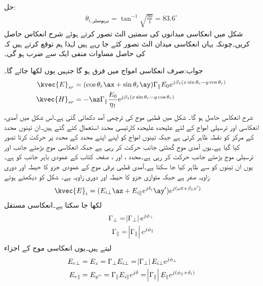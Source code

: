 حل:
\begin{align}
\theta_{i,\text{بریوسٹر}} =\tan^{-1} \sqrt{\frac{80}{1}}=83.6^{\circ}
\end{align} 
شکل  میں انعکاسی میدانوں کی سمتیں الٹ تصور کرتے ہوئے شرح انعکاس  حاصل کریں۔چونکہ یہاں انعکاسی میدان الٹ تصور کئے جا رہے ہیں لہٰذا ہم توقع کرتے ہیں کہ  کی حاصل مساوات منفی ایک سے ضرب ہو گی۔

جواب:صرف انعکاسی امواج میں فرق ہو گا جنہیں یوں لکھا جائے گا۔
\begin{align*}
\kvec{E}_{sr}&= (\cos \theta_r \ax+\sin \theta_r \ay)\Gamma_{\parallel} E_0 e^{ j \beta_1 (x \sin \theta_r-y\cos \theta_r)}\\
\kvec{H}_{sr}&=-\az\Gamma_{\parallel} \frac{ E_0}{\eta_1} e^{j \beta_1 (x \sin \theta_r-y\cos \theta_r)}
\end{align*}
شرح انعکاس  حاصل ہو گا۔
شکل  میں قطبی موج کی ترچھی آمد دکھائی گئی ہے۔اس شکل میں آمدی، انعکاسی اور ترسیلی امواج کے لئے علیحدہ علیحدہ کارتیسی محدد استعمال کئے گئے ہیں۔ان تینوں محدد کے مرکز کو نقطہ  ظاہر کرتی ہے جبکہ تینوں امواج کو اپنے اپنے محدد کے  محدد پر حرکت کرتا تصور کیا گیا ہے۔یوں آمدی موج گھٹتی  جانب حرکت کر رہی ہے جبکہ انعکاسی موج  بڑھتے  جانب اور ترسیلی موج بڑھتے  جانب حرکت کر رہی ہے۔محدد ،  اور ،  صفحہ کتاب کے عمودی باہر جانب کو ہے۔یوں ان تینوں کو  سے ظاہر کیا جا سکتا ہے۔آمدی قطبی برقی موج کے عمودی جزو کا حیطہ  اور دوری زاویہ صفر ہے جبکہ متوازی جزو کا حیطہ  اور دوری زاویہ   ہے۔ شکل کو دیکھتے ہوئے 
\begin{align}\label{مساوات_ترچھی_بیضوی__قطبی}
\kvec{E}_i&=(E_{i\perp} \az+E_{i\parallel} e^{j\delta_i}\ay')e^{j(\omega t+\beta_1 x')}
\end{align}
لکھا جا سکتا ہے۔انعکاسی مستقل
\begin{align}
\Gamma_{\perp}=\abs{\Gamma_{\perp}} e^{j\phi_{\perp}}\\
\Gamma_{\parallel}=\abs{\Gamma_{\parallel}} e^{j\phi_{\parallel}}
\end{align}
لیتے ہیں۔یوں انعکاسی موج کے  اجزاء 
\begin{align}
E_{r\perp}&=E_z=\Gamma_{\perp} E_{i\perp}=\abs{\Gamma_{\perp}}E_{i\perp} e^{j\phi_{\perp}}\\
E_{r\parallel}&=E_{y''}=\Gamma_{\parallel} E_{i\parallel}e^{j\delta}=\abs{\Gamma_{\parallel}} E_{\parallel} e^{j(\phi_{\parallel}+\delta_i)}
\end{align}
